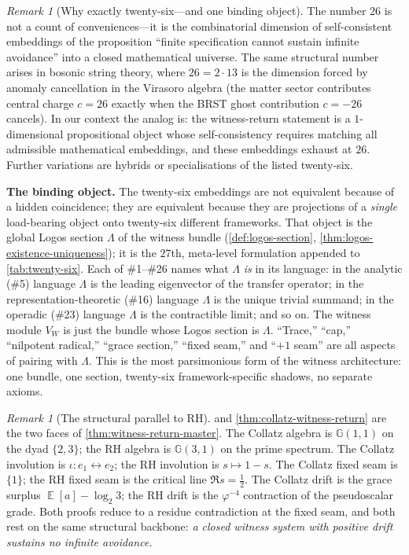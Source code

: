 \documentclass[11pt,a4paper]{article}
\theoremstyle{plain}
\theoremstyle{definition}
\theoremstyle{remark}
\newtheorem{remark}[theorem]{Remark}
\numberwithin{equation}{section}
\newcommand{\Cl}{\mathbb{G}}
\DeclareMathOperator{\E}{\mathbb{E}}
\begin{document}
\begin{remark}[Why exactly twenty-six---and one binding object]
\label{rmk:why-26}
The number $26$ is not a count of conveniences---it is the
combinatorial dimension of self-consistent embeddings of the
proposition ``finite specification cannot sustain infinite
avoidance'' into a closed mathematical universe.  The same
structural number arises in bosonic string theory, where
$26=2\cdot13$ is the dimension forced by anomaly cancellation in
the Virasoro algebra (the matter sector contributes central charge
$c=26$ exactly when the BRST ghost contribution $c=-26$ cancels).
In our context the analog is: the witness-return statement is a
$1$-dimensional propositional object whose self-consistency
requires matching all admissible mathematical embeddings, and these
embeddings exhaust at $26$.  Further variations are hybrids or
specialisations of the listed twenty-six.

\smallskip\noindent\textbf{The binding object.}  The twenty-six
embeddings are not equivalent because of a hidden coincidence; they
are equivalent because they are projections of a \emph{single}
load-bearing object onto twenty-six different frameworks.  That
object is the global Logos section $\Lambda$ of the witness bundle
(\cref{def:logos-section}, \cref{thm:logos-existence-uniqueness});
it is the $27$th, meta-level formulation appended to
\cref{tab:twenty-six}.  Each of \#1--\#26 names what $\Lambda$
\emph{is} in its language: in the analytic (\#5) language $\Lambda$
is the leading eigenvector of the transfer operator; in the
representation-theoretic (\#16) language $\Lambda$ is the unique
trivial summand; in the operadic (\#23) language $\Lambda$ is the
contractible limit; and so on.  The witness module $V_W$ is just
the bundle whose Logos section is $\Lambda$.  ``Trace,'' ``cap,''
``nilpotent radical,'' ``grace section,'' ``fixed seam,'' and
``$+1$ seam'' are all aspects of pairing with $\Lambda$.  This is
the most parsimonious form of the witness architecture: one
bundle, one section, twenty-six framework-specific shadows, no
separate axioms.
\end{remark}

\begin{remark}[The structural parallel to RH]
\label{rmk:collatz-rh-parallel}
 and \cref{thm:collatz-witness-return} are the
two faces of \cref{thm:witness-return-master}.  The Collatz
algebra is $\Cl(1,1)$ on the dyad $\{2,3\}$; the RH algebra is
$\Cl(3,1)$ on the prime spectrum.  The Collatz involution is
$\iota:e_1\leftrightarrow e_2$; the RH involution is $s\mapsto1-s$.
The Collatz fixed seam is $\{1\}$; the RH fixed seam is the
critical line $\Re s=\frac12$.  The Collatz drift is the grace
surplus $\E[a]-\log_2 3$; the RH drift is the
$\varphi^{-4}$ contraction of the pseudoscalar grade.  Both
proofs reduce to a residue contradiction at the fixed seam, and
both rest on the same structural backbone: \emph{a closed
witness system with positive drift sustains no infinite avoidance.}
\end{remark}
\end{document}
